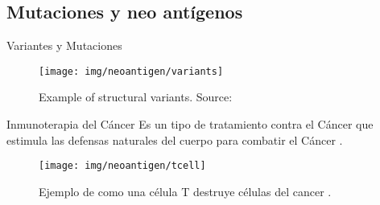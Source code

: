 \documentclass[10pt]{beamer}
\newcommand{\1}{
	\setbeamertemplate{background}{
		\texttt{[image: img/1]}
		\tikz[overlay] \fill[fill opacity=0.75,fill=white] (0,0) rectangle (-\paperwidth,\paperheight);
	}
}
\begin{document}
\subsection{Mutaciones y neo antígenos}


\begin{frame}{Variantes y Mutaciones}{}
	\begin{figure}[h]
		\centering
		\texttt{[image: img/neoantigen/variants]}
		\caption{Example of structural variants. Source: \cite{sv_pacbio_2021}}
		\label{fig:variants}
	\end{figure}	
\end{frame}


\begin{frame}{Inmunoterapia del Cáncer}{}		
	Es un tipo de tratamiento contra el Cáncer que estimula las defensas naturales del cuerpo para combatir el Cáncer \cite{inmunoterapy2022}.
		
	\begin{figure}
		\texttt{[image: img/neoantigen/tcell]}
		\caption{Ejemplo de como una célula T destruye células del cancer \cite{nortshore2022}.}
	\end{figure}		
\end{frame}
\end{document}
